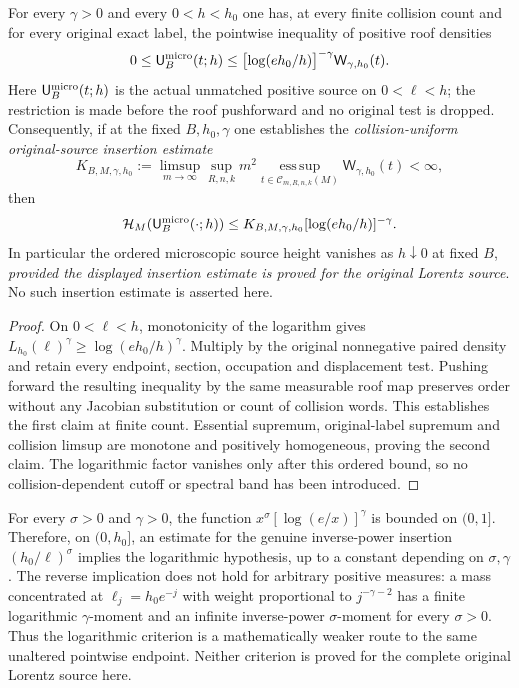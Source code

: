 \begin{theorem}
\label{thm:v106-logarithmic}
For every $\gamma>0$ and every $0<h<h_0$ one has, at every finite
collision count and for every original exact label, the pointwise
inequality of positive roof densities
\[
  0\le \mathsf U_{B}^{\rm micro}(t;h)
    \le \bigl[\log(eh_0/h)\bigr]^{-\gamma}
          \mathsf W_{\gamma,h_0}(t).
\]
Here $\mathsf U_{B}^{\rm micro}(t;h)$ is the actual unmatched
positive source on $0<\ell<h$; the restriction is made before
the roof pushforward and no original test is dropped.
Consequently, if at the fixed $B,h_0,\gamma$ one establishes the
\emph{collision-uniform original-source insertion estimate}
\[
  K_{B,M,\gamma,h_0}:=
  \limsup_{m\to\infty}\sup_{R,n,k}m^2
    \operatorname*{ess\,sup}_{t\in\mathcal C_{m,R,n,k}(M)}
       \mathsf W_{\gamma,h_0}(t)<\infty ,
\]
then
\[
 \mathcal H_M(\mathsf U_B^{\rm micro}(\cdot;h))
 \le K_{B,M,\gamma,h_0}
           [\log(eh_0/h)]^{-\gamma}.
\]
In particular the ordered microscopic source height vanishes
as $h\downarrow0$ at fixed $B$, \emph{provided the displayed
insertion estimate is proved for the original Lorentz source}.
No such insertion estimate is asserted here.
\end{theorem}
\begin{proof}
On $0<\ell<h$, monotonicity of the logarithm gives
$L_{h_0}(\ell)^\gamma\ge\log(eh_0/h)^\gamma$.
Multiply by the original nonnegative paired density and retain
every endpoint, section, occupation and displacement test. Pushing
forward the resulting inequality by the same measurable roof map
preserves order without any Jacobian substitution or count of
collision words. This establishes the first claim at finite count.
Essential supremum, original-label supremum and collision limsup
are monotone and positively homogeneous, proving the second claim.
The logarithmic factor vanishes only after this ordered bound, so
no collision-dependent cutoff or spectral band has been introduced.
\end{proof}

\begin{remark}
\label{rem:v106-power}
For every $\sigma>0$ and $\gamma>0$, the function
$x^\sigma[\log(e/x)]^\gamma$ is bounded on $(0,1]$.
Therefore, on $(0,h_0]$, an estimate for the genuine inverse-power
insertion $(h_0/\ell)^\sigma$ implies the logarithmic hypothesis,
up to a constant depending on $\sigma,\gamma$. The reverse
implication does not hold for arbitrary positive measures: a mass
concentrated at $\ell_j=h_0e^{-j}$ with weight proportional to
$j^{-\gamma-2}$ has a finite logarithmic $\gamma$-moment and
an infinite inverse-power $\sigma$-moment for every $\sigma>0$.
Thus the logarithmic criterion is a mathematically weaker route
to the same unaltered pointwise endpoint. Neither criterion is
proved for the complete original Lorentz source here.
\end{remark}
